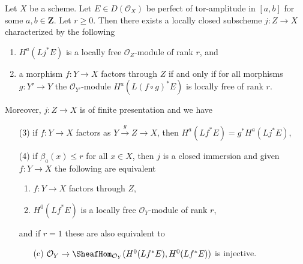 \begin{lemma}
\label{lemma-locally-closed-where-H0-locally-free}
Let $X$ be a scheme. Let $E \in D(\mathcal{O}_X)$ be perfect
of tor-amplitude in $[a, b]$ for some $a, b \in \mathbf{Z}$.
Let $r \geq 0$.
Then there exists a locally closed subscheme $j : Z \to X$
characterized by the following
\begin{enumerate}
\item $H^a(Lj^*E)$ is a locally free $\mathcal{O}_Z$-module of rank $r$, and
\item a morphism $f : Y \to X$ factors through $Z$
if and only if for all morphisms $g : Y' \to Y$ the
$\mathcal{O}_{Y'}$-module $H^a(L(f \circ g)^*E)$ is locally free
of rank $r$.
\end{enumerate}
Moreover, $j : Z \to X$ is of finite presentation and we have
\begin{enumerate}
\item[(3)] if $f : Y \to X$ factors as $Y \xrightarrow{g} Z \to X$, then
$H^a(Lf^*E) = g^*H^a(Lj^*E)$,
\item[(4)] if $\beta_a(x) \leq r$ for all $x \in X$, then
$j$ is a closed immersion and given $f : Y \to X$ the following
are equivalent
\begin{enumerate}
\item $f : Y \to X$ factors through $Z$,
\item $H^0(Lf^*E)$ is a locally free $\mathcal{O}_Y$-module of rank $r$,
\end{enumerate}
and if $r = 1$ these are also equivalent to
\begin{enumerate}
\item[(c)] $\mathcal{O}_Y \to \SheafHom_{\mathcal{O}_Y}(H^0(Lf^*E), H^0(Lf^*E))$
is injective.
\end{enumerate}
\end{enumerate}
\end{lemma}

